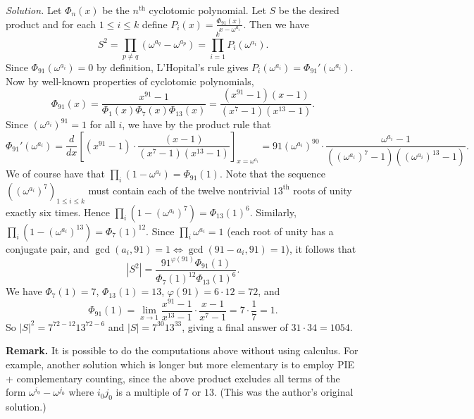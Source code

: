 \documentclass[10pt]{article}
\newcommand{\solution}
{
\vspace{5pt}
\noindent\textit{Solution.}\qquad
}
\begin{document}
\begin{enumerate}
\solution Let $\Phi_n(x)$ be the $n^{\text{th}}$ cyclotomic polynomial.  Let $S$ be the desired product and for each $1\leq i\leq k$ define $P_i(x) = \tfrac{\Phi_{91}(x)}{x-\omega^{a_i}}$.  Then we have \[S^2 = \prod_{p\neq q}(\omega^{a_q} - \omega^{a_p}) = \prod_{i=1}^kP_i(\omega^{a_i}).\] Since $\Phi_{91}(\omega^{a_i}) = 0$ by definition, L'Hopital's rule gives $P_i(\omega^{a_i}) = \Phi_{91}'(\omega^{a_i})$.  Now by well-known properties of cyclotomic polynomials, \[\Phi_{91}(x) = \frac{x^{91} - 1}{\Phi_1(x)\Phi_7(x)\Phi_{13}(x)} = \frac{(x^{91} - 1)(x - 1)}{(x^7 - 1)(x^{13} - 1)}.\] Since $(\omega^{a_i})^{91} = 1$ for all $i$, we have by the product rule that \[\Phi_{91}'(\omega^{a_i}) = \frac{d}{dx}\left[(x^{91} - 1)\cdot \frac{(x - 1)}{(x^7 - 1)(x^{13} - 1)}\right]_{x = \omega^{a_i}}  = 91(\omega^{a_i})^{90}\cdot\frac{\omega^{a_i} - 1}{((\omega^{a_i})^7 - 1)((\omega^{a_i})^{13} - 1)}.\] We of course have that $\prod_i(1 - \omega^{a_i}) = \Phi_{91}(1)$. Note that the sequence $((\omega^{a_i})^7)_{1\leq i\leq k}$ must contain each of the twelve nontrivial $13^{\text{th}}$ roots of unity exactly six times.  Hence $\prod_i(1-(\omega^{a_i})^7) = \Phi_{13}(1)^6$.  Similarly, $\prod_i(1 - (\omega^{a_i})^{13}) = \Phi_7(1)^{12}$.  Since $\prod_i\omega^{a_i} = 1$ (each root of unity has a conjugate pair, and $\gcd(a_i,91) = 1\Leftrightarrow \gcd(91-a_i,91) = 1$), it follows that \[|S^2| = \frac{91^{\varphi(91)}\Phi_{91}(1)}{\Phi_7(1)^{12}\Phi_{13}(1)^6}.\] We have $\Phi_7(1) = 7$, $\Phi_{13}(1) = 13$, $\varphi(91) = 6\cdot 12 = 72$, and \[\Phi_{91}(1) = \lim_{x\to 1}\frac{x^{91} - 1}{x^{13} - 1}\cdot\frac{x-1}{x^7 - 1} = 7\cdot\frac17 = 1.\] So $|S|^2 = 7^{72-12}13^{72-6}$ and $|S| = 7^{30}13^{33}$, giving a final answer of $31\cdot 34 = \boxed{1054}$.

\textbf{Remark. }It is possible to do the computations above without using calculus.  For example, another solution which is longer but more elementary is to employ PIE + complementary counting, since the above product excludes all terms of the form $\omega^{i_0} - \omega^{j_0}$ where $i_0j_0$ is a multiple of $7$ or $13$.  (This was the author's original solution.)

\end{enumerate}
\end{document}
